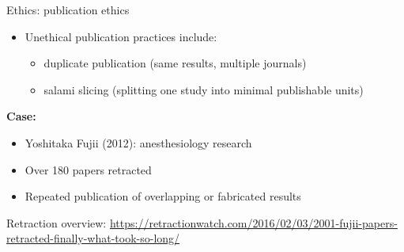 \documentclass[aspectratio=169]{beamer}
\begin{document}
\begin{frame}{Ethics: publication ethics}
  \begin{itemize}
    \item Unethical publication practices include:
      \begin{itemize}
        \item duplicate publication (same results, multiple journals)
        \item salami slicing (splitting one study into minimal publishable units)
      \end{itemize}
  \end{itemize}

  \vspace{0.5em}
  \textbf{Case:}
  \begin{itemize}
    \item Yoshitaka Fujii (2012): anesthesiology research
    \item Over 180 papers retracted
    \item Repeated publication of overlapping or fabricated results
  \end{itemize}

  \vspace{0.3em}
  \tiny
  Retraction overview: \url{https://retractionwatch.com/2016/02/03/2001-fujii-papers-retracted-finally-what-took-so-long/}

  \vspace{0.5em}
\end{frame}
\end{document}
